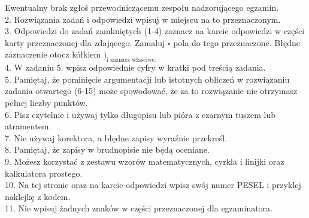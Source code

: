 \documentclass[10pt]{article}
\begin{document}
Ewentualny brak zgłoś przewodniczącemu zespołu nadzorującego egzamin.\\
2. Rozwiązania zadań i odpowiedzi wpisuj w miejscu na to przeznaczonym.\\
3. Odpowiedzi do zadań zamkniętych (1-4) zaznacz na karcie odpowiedzi w części karty przeznaczonej dla zdającego. Zamaluj \(\square\) pola do tego przeznaczone. Błędne zaznaczenie otocz kółkiem \()_{\text {i zaznacz właściwe. }}\)\\
4. W zadaniu 5. wpisz odpowiednie cyfry w kratki pod treścią zadania.\\
5. Pamiętaj, że pominięcie argumentacji lub istotnych obliczeń w rozwiązaniu zadania otwartego (6-15) może spowodować, że za to rozwiązanie nie otrzymasz pełnej liczby punktów.\\
6. Pisz czytelnie i używaj tylko długopisu lub pióra z czarnym tuszem lub atramentem.\\
7. Nie używaj korektora, a błędne zapisy wyraźnie przekreśl.\\
8. Pamiętaj, że zapisy w brudnopisie nie będą oceniane.\\
9. Możesz korzystać z zestawu wzorów matematycznych, cyrkla i linijki oraz kalkulatora prostego.\\
10. Na tej stronie oraz na karcie odpowiedzi wpisz swój numer PESEL i przyklej naklejkę z kodem.\\
11. Nie wpisuj żadnych znaków w części przeznaczonej dla egzaminatora.\\
\end{document}

